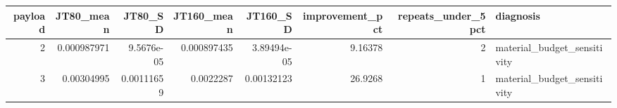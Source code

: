 \begin{tabular}{rrrrrrrl}
\toprule
payload & JT80\_mean & JT80\_SD & JT160\_mean & JT160\_SD & improvement\_pct & repeats\_under\_5pct & diagnosis \\
\midrule
2 & 0.000987971 & 9.5676e-05 & 0.000897435 & 3.89494e-05 & 9.16378 & 2 & material\_budget\_sensitivity \\
3 & 0.00304995 & 0.00111659 & 0.0022287 & 0.00132123 & 26.9268 & 1 & material\_budget\_sensitivity \\
\bottomrule
\end{tabular}
